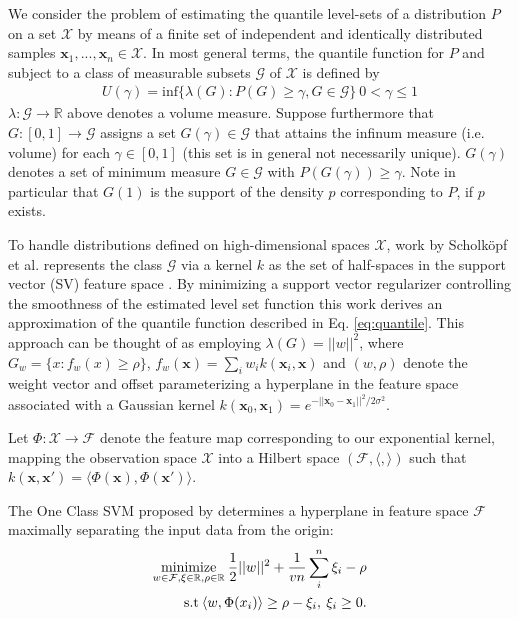 \documentclass[10pt, conference]{ieeeconf}      %
\newcommand{\bx}{\mathbf{x}}
\begin{document}
We consider the problem of estimating the quantile level-sets of a distribution $P$ on a set $\mathcal{X}$ by means of a finite set of
independent and identically distributed samples $\mathbf{x}_1,...,\mathbf{x}_n\in \mathcal{X}$.
In most general terms, the quantile function for $P$ and subject to a class of measurable subsets $\mathcal{G}$ of $\mathcal{X}$ is
defined by
\vspace{-2ex}
\begin{align}\label{eq:quantile}
U(\gamma) = \mbox{inf} \lbrace \lambda(G):P(G) \geq \gamma, G \in \mathcal{G} \rbrace \: 0<\gamma \leq 1
\end{align} 
$\lambda:\mathcal{G}\to \mathbb{R}$ above denotes a volume measure.
Suppose furthermore that $G:[0,1]\to \mathcal{G}$ assigns a set $G(\gamma) \in \mathcal{G}$ that attains the infinum
measure (i.e. volume) for each $\gamma\in [0,1]$ (this set is in general not necessarily unique). 
$G(\gamma)$ denotes a set of minimum measure $G \in \mathcal{G}$ with $P(G(\gamma))\ge \gamma$. Note in particular that $G(1)$ is the support of the density $p$ corresponding to $P$, if $p$ exists. 

To handle distributions defined on high-dimensional spaces $\mathcal{X}$, work by Scholk{\"o}pf et al. represents the class $\mathcal{G}$ via a kernel $k$ as the set of half-spaces in the support vector (SV) feature space \cite{scholkopf2001estimating}. 
By minimizing a support vector regularizer controlling the smoothness of the estimated level set function this work
derives an approximation of the quantile function described in Eq. \ref{eq:quantile}.
This approach can be thought of as employing $\lambda(G) = ||w||^2$, where $G_w = \lbrace x: f_w(x) \geq \rho \rbrace$,
$f_w(\mathbf{x}) = \sum_i w_i k(\mathbf{x}_i, \mathbf{x})$
and $(w,\rho)$ denote the weight vector and offset parameterizing a hyperplane in the feature space associated with a
Gaussian kernel $k(\bx_0,\bx_1) = e^{-||\bx_0 - \bx_1||^2/2\sigma^2}$.


Let $\Phi:\mathcal{X}\to \mathcal{F}$ denote the feature map corresponding to our exponential kernel, mapping the
observation space $\mathcal{X}$ into a Hilbert space $(\mathcal{F}, \langle, \rangle)$ such that $k(\bx, \bx') = \langle
\Phi(\bx), \Phi(\bx')\rangle$.

The One Class SVM proposed by \cite{scholkopf2001estimating} determines a hyperplane in feature space $\mathcal{F}$
maximally separating the input data from the origin:
\vspace{-2ex}
\begin{align}\label{eq:primal_sup}
    \underset{w\in \mathcal{F}, \mathbf{\xi} \in \mathbb{R}, \rho \in \mathbb{R}}{\mbox{minimize}}\: \frac{1}{2}||w||^2+\frac{1}{vn} \sum^n_i \xi_i - \rho\\
\mbox{s.t} \: \langle w,\Phi(x_i) \rangle \geq \rho - \xi_i, \: \xi_i \geq 0 \notag.
\end{align}
\end{document}
